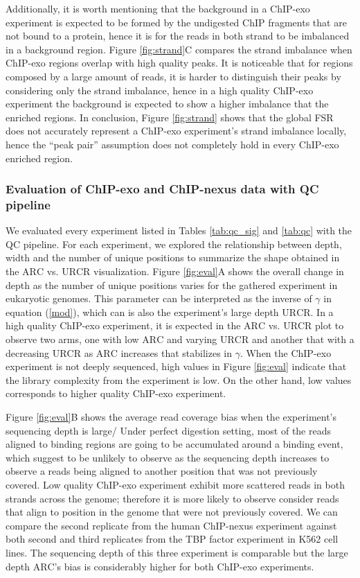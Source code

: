 \documentclass{bmcart}
\begin{document}
Additionally, it is worth mentioning that the background in a ChIP-exo
experiment is expected to be formed by the undigested ChIP fragments
that are not bound to a protein, hence it is for the reads in both
strand to be imbalanced in a background region. Figure
\ref{fig:strand}C compares the strand imbalance when ChIP-exo regions
overlap with high quality peaks. It is noticeable that for regions
composed by a large amount of reads, it is harder to distinguish their
peaks by considering only the strand imbalance, hence in a high
quality ChIP-exo experiment the background is expected to show a
higher imbalance that the enriched regions. In conclusion, Figure
\ref{fig:strand} shows that the global FSR does not accurately
represent a ChIP-exo experiment's strand imbalance locally, hence the
``peak pair'' assumption does not completely hold in every ChIP-exo
enriched region.

\subsubsection*{Evaluation of ChIP-exo and ChIP-nexus data with QC
  pipeline}

We evaluated every experiment listed in Tables \ref{tab:qc_sig} and
\ref{tab:qc} with the QC pipeline. For each experiment, we explored
the relationship between depth, width and the number of unique
positions to summarize the shape obtained in the $\mbox{ARC}$
vs. $\mbox{URCR}$ visualization. Figure \ref{fig:eval}A shows the
overall change in depth as the number of unique positions varies for
the gathered experiment in eukaryotic genomes. This parameter can be
interpreted as the inverse of $\gamma$ in equation (\ref{mod}), which
can is also the experiment's large depth $\mbox{URCR}$. In a high
quality ChIP-exo experiment, it is expected in the $\mbox{ARC}$
vs. $\mbox{URCR}$ plot to observe two arms, one with low $\mbox{ARC}$
and varying $\mbox{URCR}$ and another that with a decreasing
$\mbox{URCR}$ as $\mbox{ARC}$ increases that stabilizes in
$\gamma$. When the ChIP-exo experiment is not deeply sequenced, high
values in Figure \ref{fig:eval} indicate that the library complexity
from the experiment is low. On the other hand, low values corresponds
to higher quality ChIP-exo experiment.

Figure \ref{fig:eval}B shows the average read coverage bias when the
experiment's sequencing depth is large/ Under perfect digestion
setting, most of the reads aligned to binding regions are going to be
accumulated around a binding event, which suggest to be unlikely to
observe as the sequencing depth increases to observe a reads being
aligned to another position that was not previously covered. Low
quality ChIP-exo experiment exhibit more scattered reads in both
strands across the genome; therefore it is more likely to observe
consider reads that align to position in the genome that were not
previously covered. We can compare the second replicate from the human
ChIP-nexus experiment against both second and third replicates from
the TBP factor experiment in K562 cell lines. The sequencing depth of
this three experiment is comparable but the large depth $\mbox{ARC}$'s
bias is considerably higher for both ChIP-exo experiments.
\end{document}
